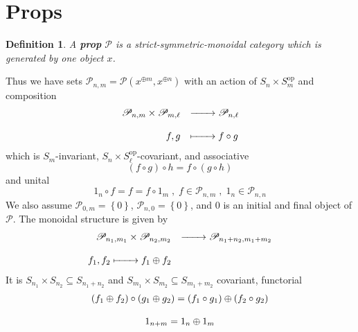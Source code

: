 \documentclass[leqno]{article}
\newcommand{\myemph}[1]{{\it{\bf{#1}}}}
\newcommand{\op}{\text{op}}
\newcommand{\biop}{\mathscr{P}}
\newtheorem{definition}[equation]{Definition} %
\numberwithin{equation}{section}
\begin{document}
\section{Props} \label{sec:10}
\begin{definition}
				A \myemph{prop} $\biop$ is a strict-symmetric-monoidal category which is generated
				by one object $x$. 
				\label{def:10.1}
\end{definition}
\noindent Thus we have sets $\biop_{n,m}=\biop\left( x^{\oplus m},x^{\oplus n} \right)$ with an
action of $S_n\times S_m^{\op}$ and composition
\begin{equation}
				\begin{array}[H]{rl}
				\biop_{n,m}\times \biop_{m,\ell}&\xrightarrow{\qquad}  \biop_{n,\ell} \\\\
				f,g &\xmapsto{\qquad} f\circ g
				\end{array}
				\label{eq:10.2}
\end{equation}
which is $S_{m}$-invariant, $S_{n}\times S_{\ell}^{\op}$-covariant, and associative
\begin{equation}
				(f\circ g )\circ h = f\circ (g\circ h)
				\label{eq:10.3}
\end{equation}
and unital 
\begin{equation}
				1_{n}\circ f = f = f\circ 1_{m} \; , \; f\in \biop_{n,m}\; , \;
				1_{n}\in\biop_{n,n}
				\label{eq:10.4}
\end{equation}
We also assume $\biop_{0,m}=\left\{ 0 \right\}$, $\biop_{n,0}=\left\{ 0 \right\}$, and
$0$ is an initial and final object of $\biop$. The monoidal structure is given by 
\begin{equation}
				\begin{array}[H]{rl}
								\biop_{n_1,m_1}\times \biop_{n_2,m_2} &\xrightarrow{\qquad}
								\biop_{n_1+n_2,m_1+m_2} \\\\
								f_1,f_2\xmapsto{\qquad}f_1\oplus f_2
				\end{array}
				\label{eq:10.5}
\end{equation}
It is $S_{n_1}\times S_{n_2}\subseteq S_{n_1+n_2}$ and $S_{m_1}\times S_{m_2}\subseteq
S_{m_1+m_2}$ covariant, functorial 
\begin{equation}
				\begin{array}[H]{c}
				(f_{1}\oplus f_2)\circ (g_1\oplus g_2) = (f_1\circ g_1)\oplus (f_2\circ g_2) \\\\
				1_{n+m}= 1_n\oplus 1_m
				\end{array}
				\label{eq:10.6}
\end{equation}
\end{document}
